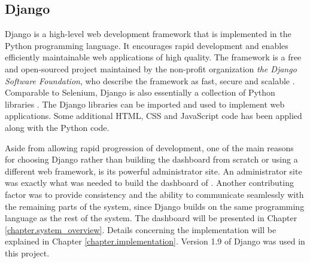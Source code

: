     \iffalse
        selenium web browser automation (collection of Python libraries)
        selenium server?
        selenium grid
    \fi

\subsection{Django}\label{subsection.django} %
Django is a high-level web development framework that is implemented in the Python programming language. It encourages rapid development and enables efficiently maintainable web applications of high quality. The framework is a free and open-sourced project maintained by the non-profit organization \emph{the Django Software Foundation}, who describe the framework as fast, secure and scalable \cite{djangoproject}. Comparable to Selenium, Django is also essentially a collection of Python libraries \cite{thedjangobook}. The Django libraries can be imported and used to implement web applications. Some additional HTML, CSS and JavaScript code has been applied along with the Python code.


Aside from allowing rapid progression of development, one of the main reasons for choosing Django rather than building the dashboard from scratch or using a different web framework, is its powerful administrator site. An administrator site was exactly what was needed to build the dashboard of \toolname. Another contributing factor was to provide consistency and the ability to communicate seamlessly with the remaining parts of the system, since Django builds on the same programming language as the rest of the system. The dashboard will be presented in Chapter \ref{chapter.system_overview}. Details concerning the implementation will be explained in Chapter \ref{chapter.implementation}. Version 1.9 of Django was used in this project.

